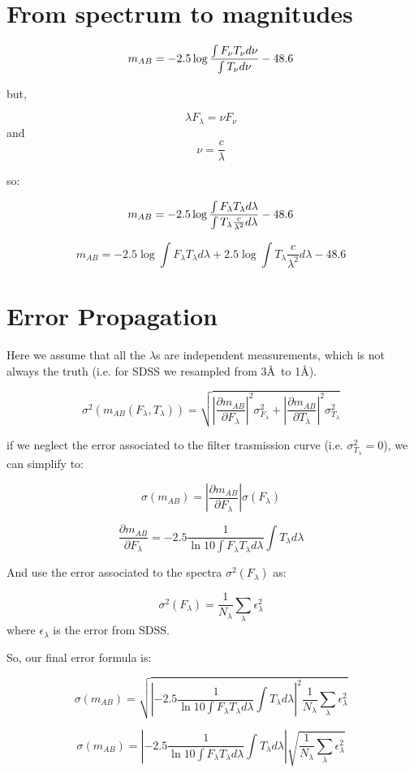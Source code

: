 \documentclass[11pt]{article}
\def\ni{\noindent}                                       %
\begin{document}
\section{From spectrum to magnitudes}

$$ m_{AB} = -2.5 \log{ {\int F_\nu T_\nu d\nu}\over{\int T_\nu d\nu} } - 48.6 $$

\ni but,

$$ \lambda F_\lambda = \nu F_\nu $$ and $$ \nu = \frac{c}{\lambda} $$

so:

$$ m_{AB} = -2.5 \log { {\int F_\lambda T_\lambda d\lambda}\over{\int T_\lambda \frac{c}{\lambda^2} d\lambda} } - 48.6 $$


$$ m_{AB} = -2.5 \log \int F_\lambda T_\lambda d\lambda + 2.5 \log \int T_\lambda \frac{c}{\lambda^2} d\lambda - 48.6 $$

\section{Error Propagation}

Here we assume that all the $\lambda$s are independent measurements, which is not always the truth (i.e. for SDSS we resampled from 3\AA\ to 1\AA).

$$ \sigma^2(m_{AB}(F_\lambda, T_\lambda)) = \sqrt{\left| \frac{\partial m_{AB}}{\partial F_\lambda} \right|^2 \sigma^2_{F_\lambda} + \left| \frac{\partial m_{AB}}{\partial T_\lambda} \right|^2 \sigma^2_{T_\lambda} } $$

if we neglect the error associated to the filter trasmission curve (i.e. $\sigma^2_{T_\lambda} = 0$), we can simplify to:

$$ \sigma(m_{AB}) = \left| \frac{\partial m_{AB}}{\partial F_\lambda} \right| \sigma(F_\lambda)$$

$$ \frac{\partial m_{AB}}{\partial F_\lambda} = -2.5 \frac{1}{\ln 10 \int F_\lambda T_\lambda d\lambda} \int T_\lambda d\lambda $$

And use the error associated to the spectra $\sigma^2(F_\lambda)$ as:

$$\sigma^2(F_\lambda) = \frac{1}{N_\lambda} \sum_\lambda \epsilon^2_\lambda$$ where $\epsilon_\lambda$ is the error from SDSS. 

So, our final error formula is:

$$ \sigma(m_{AB}) = \sqrt{ \left| -2.5 \frac{1}{\ln 10 \int F_\lambda T_\lambda d\lambda} \int T_\lambda d\lambda  \right|^2  \frac{1}{N_\lambda} \sum_\lambda \epsilon^2_\lambda }$$

$$ \sigma(m_{AB}) = \left| -2.5 \frac{1}{\ln 10 \int F_\lambda T_\lambda d\lambda} \int T_\lambda d\lambda  \right| \sqrt{ \frac{1}{N_\lambda} \sum_\lambda \epsilon^2_\lambda }$$
\end{document}
